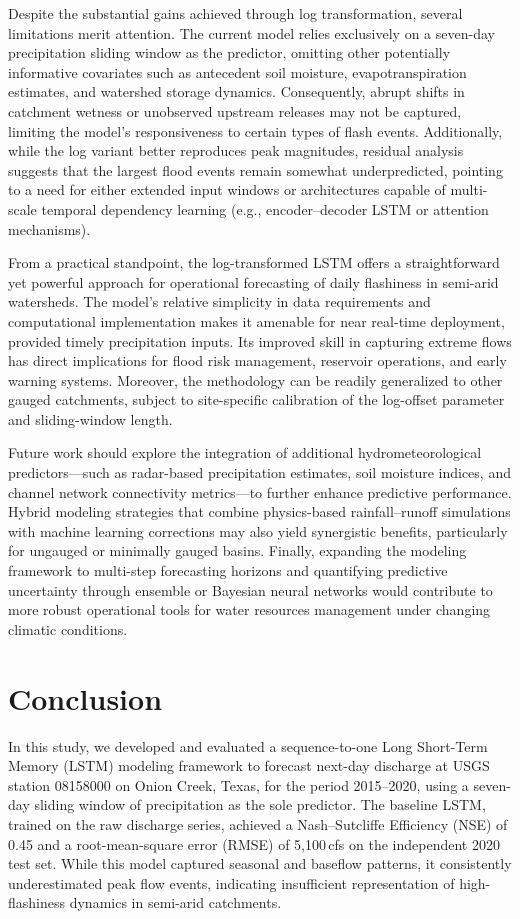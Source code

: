 \documentclass[preprint,12pt]{elsarticle}
\begin{document}
Despite the substantial gains achieved through log transformation, several limitations merit attention. The current model relies exclusively on a seven-day precipitation sliding window as the predictor, omitting other potentially informative covariates such as antecedent soil moisture, evapotranspiration estimates, and watershed storage dynamics. Consequently, abrupt shifts in catchment wetness or unobserved upstream releases may not be captured, limiting the model's responsiveness to certain types of flash events. Additionally, while the log variant better reproduces peak magnitudes, residual analysis suggests that the largest flood events remain somewhat underpredicted, pointing to a need for either extended input windows or architectures capable of multi-scale temporal dependency learning (e.g., encoder--decoder LSTM or attention mechanisms).

From a practical standpoint, the log-transformed LSTM offers a straightforward yet powerful approach for operational forecasting of daily flashiness in semi-arid watersheds. The model's relative simplicity in data requirements and computational implementation makes it amenable for near real-time deployment, provided timely precipitation inputs. Its improved skill in capturing extreme flows has direct implications for flood risk management, reservoir operations, and early warning systems. Moreover, the methodology can be readily generalized to other gauged catchments, subject to site-specific calibration of the log-offset parameter and sliding-window length.

Future work should explore the integration of additional hydrometeorological predictors—such as radar-based precipitation estimates, soil moisture indices, and channel network connectivity metrics—to further enhance predictive performance. Hybrid modeling strategies that combine physics-based rainfall–runoff simulations with machine learning corrections may also yield synergistic benefits, particularly for ungauged or minimally gauged basins. Finally, expanding the modeling framework to multi-step forecasting horizons and quantifying predictive uncertainty through ensemble or Bayesian neural networks would contribute to more robust operational tools for water resources management under changing climatic conditions.

\section{Conclusion}

In this study, we developed and evaluated a sequence-to-one Long Short-Term Memory (LSTM) modeling framework to forecast next-day discharge at USGS station 08158000 on Onion Creek, Texas, for the period 2015--2020, using a seven-day sliding window of precipitation as the sole predictor. The baseline LSTM, trained on the raw discharge series, achieved a Nash--Sutcliffe Efficiency (NSE) of 0.45 and a root-mean-square error (RMSE) of 5,100\,cfs on the independent 2020 test set. While this model captured seasonal and baseflow patterns, it consistently underestimated peak flow events, indicating insufficient representation of high-flashiness dynamics in semi-arid catchments.
\end{document}
